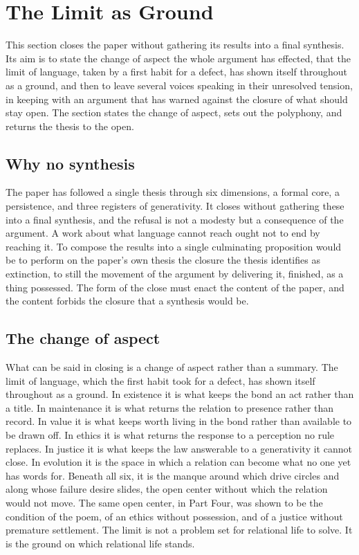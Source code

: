 \section{The Limit as Ground}
\label{p26:sec:close}

\noindent
This section closes the paper without gathering its results into a final synthesis. Its aim is to state the change of aspect the whole argument has effected, that the limit of language, taken by a first habit for a defect, has shown itself throughout as a ground, and then to leave several voices speaking in their unresolved tension, in keeping with an argument that has warned against the closure of what should stay open. The section states the change of aspect, sets out the polyphony, and returns the thesis to the open.

\subsection*{Why no synthesis}

The paper has followed a single thesis through six dimensions, a formal core, a persistence, and three registers of generativity. It closes without gathering these into a final synthesis, and the refusal is not a modesty but a consequence of the argument. A work about what language cannot reach ought not to end by reaching it. To compose the results into a single culminating proposition would be to perform on the paper's own thesis the closure the thesis identifies as extinction, to still the movement of the argument by delivering it, finished, as a thing possessed. The form of the close must enact the content of the paper, and the content forbids the closure that a synthesis would be.

\subsection*{The change of aspect}

What can be said in closing is a change of aspect rather than a summary. The limit of language, which the first habit took for a defect, has shown itself throughout as a ground. In existence it is what keeps the bond an act rather than a title. In maintenance it is what returns the relation to presence rather than record. In value it is what keeps worth living in the bond rather than available to be drawn off. In ethics it is what returns the response to a perception no rule replaces. In justice it is what keeps the law answerable to a generativity it cannot close. In evolution it is the space in which a relation can become what no one yet has words for. Beneath all six, it is the manque around which drive circles and along whose failure desire slides, the open center without which the relation would not move. The same open center, in Part Four, was shown to be the condition of the poem, of an ethics without possession, and of a justice without premature settlement. The limit is not a problem set for relational life to solve. It is the ground on which relational life stands.

